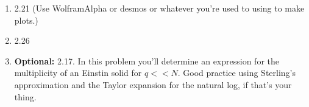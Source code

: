 \documentclass[12pt]{article}
\begin{document}
\begin{enumerate}
\item 2.21 (Use WolframAlpha or desmos or whatever you're used to
  using to make plots.)

\item 2.26

\item {\bf Optional:} 2.17. In this problem you'll determine an
  expression for the multiplicity of an Einstin solid for $q <<
  N$. Good practice using Sterling's approximation and the Taylor
  expansion for the natural log, if that's your thing.

  
\end{enumerate}
\end{document}

